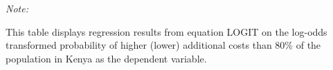 \begin{table}[htbp!]
\begin{adjustbox}{width = 1\textwidth, max height = 0.95\textheight, center}
\begin{threeparttable}[b]
         \begin{tablenotes}\item \medskip \textit{Note:}
            \item This table displays regression results from equation LOGIT on the log-odds transformed probability of higher (lower) additional costs than 80\% of the population in Kenya as the dependent variable. 
         \end{tablenotes}
      \end{threeparttable}
   \end{adjustbox}
\end{table}


